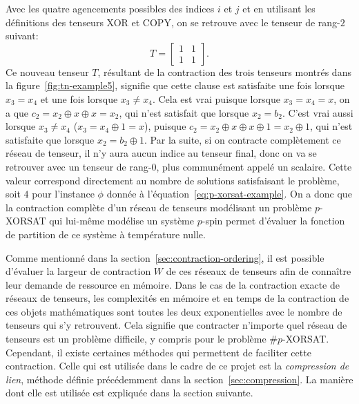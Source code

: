 Avec les quatre agencements possibles des indices $i$ et $j$ et en utilisant les définitions des tenseurs XOR et COPY, on se retrouve avec le tenseur de rang-$2$ suivant:
\begin{equation}
    T = \begin{bmatrix}
        1 & 1\\
        1 & 1
    \end{bmatrix}.
\end{equation}
Ce nouveau tenseur $T$, résultant de la contraction des trois tenseurs montrés dans la figure~\ref{fig:tn-example5}, signifie que cette clause est satisfaite une fois lorsque $x_3 = x_4$ et une fois lorsque $x_3 \ne x_4$.
Cela est vrai puisque lorsque $x_3 = x_4 = x$, on a que $c_2 = x_2 \oplus x \oplus x = x_2$, qui n'est satisfait que lorsque $x_2 = b_2$.
C'est vrai aussi lorsque $x_3 \ne x_4$ ($x_3 = x_4 \oplus 1 = x$), puisque $c_2 = x_2 \oplus x \oplus x \oplus 1 = x_2 \oplus 1$, qui n'est satisfaite que lorsque $x_2 = b_2 \oplus 1$.
Par la suite, si on contracte complètement ce réseau de tenseur, il n'y aura aucun indice au tenseur final, donc on va se retrouver avec un tenseur de rang-$0$, plus communément appelé un scalaire.
Cette valeur correspond directement au nombre de solutions satisfaisant le problème, soit $4$ pour l'instance $\phi$ donnée à l'équation~\ref{eq:p-xorsat-example}.
On a donc que la contraction complète d'un réseau de tenseurs modélisant un problème $p$-XORSAT qui lui-même modélise un système $p$-spin permet d'évaluer la fonction de partition de ce système à température nulle.

Comme mentionné dans la section~\ref{sec:contraction-ordering}, il est possible d'évaluer la largeur de contraction $W$ de ces réseaux de tenseurs afin de connaître leur demande de ressource en mémoire.
Dans le cas de la contraction exacte de réseaux de tenseurs, les complexités en mémoire et en temps de la contraction de ces objets mathématiques sont toutes les deux exponentielles avec le nombre de tenseurs qui s'y retrouvent.
Cela signifie que contracter n'importe quel réseau de tenseurs est un problème difficile, y compris pour le problème \#$p$-XORSAT.
Cependant, il existe certaines méthodes qui permettent de faciliter cette contraction.
Celle qui est utilisée dans le cadre de ce projet est la \emph{compression de lien}, méthode définie précédemment dans la section~\ref{sec:compression}.
La manière dont elle est utilisée est expliquée dans la section suivante.



